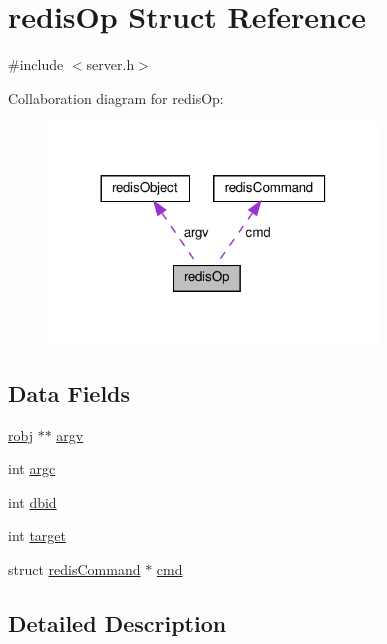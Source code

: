\hypertarget{structredis_op}{}\section{redis\+Op Struct Reference}
\label{structredis_op}


{\ttfamily \#include $<$server.\+h$>$}



Collaboration diagram for redis\+Op\+:
\nopagebreak
\begin{figure}[H]
\begin{center}
\leavevmode
\includegraphics[width=248pt]{structredis_op__coll__graph}
\end{center}
\end{figure}
\subsection*{Data Fields}
\begin{DoxyCompactItemize}
\item 
\hyperlink{server_8h_a540f174d2685422fbd7d12e3cd44c8e2}{robj} $\ast$$\ast$ \hyperlink{structredis_op_a5c75dd3cb8eb8a3f5be7d4fdf48a9ef9}{argv}
\item 
int \hyperlink{structredis_op_ad1447518f4372828b8435ae82e48499e}{argc}
\item 
int \hyperlink{structredis_op_adc62368127157e2b3ff9cabe77f4f337}{dbid}
\item 
int \hyperlink{structredis_op_ae8aa5cb4faa95420993aad5d4f2e839f}{target}
\item 
struct \hyperlink{structredis_command}{redis\+Command} $\ast$ \hyperlink{structredis_op_a8ed6c4d0c6382ad1787b32d10db25c5e}{cmd}
\end{DoxyCompactItemize}


\subsection{Detailed Description}


